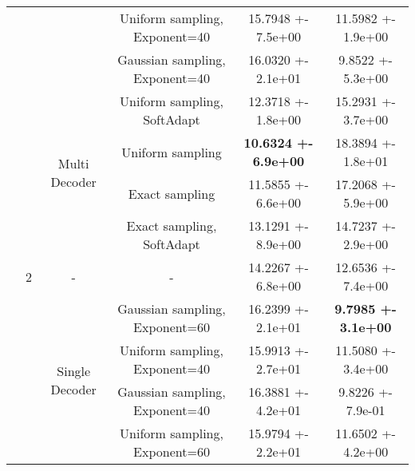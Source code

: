 \begin{center}
\begin{table}
\begin{tabular}{||c|c|c|c|c|c||}
\cline{4-6}
 &  &  & Uniform sampling, Exponent=40 & 15.7948 +- 7.5e+00 & 11.5982 +- 1.9e+00 \\
\cline{4-6}
 &  &  & Gaussian sampling, Exponent=40 & 16.0320 +- 2.1e+01 & 9.8522 +- 5.3e+00 \\
\cline{4-6}
\cline{3-6}
\cline{2-6}
 & \multirow{9}{*}{2} & \multirow{4}{*}{Multi Decoder} & Uniform sampling, SoftAdapt & 12.3718 +- 1.8e+00 & 15.2931 +- 3.7e+00 \\
\cline{4-6}
 &  &  & Uniform sampling & \textbf{10.6324 +- 6.9e+00} & 18.3894 +- 1.8e+01 \\
\cline{4-6}
 &  &  & Exact sampling & 11.5855 +- 6.6e+00 & 17.2068 +- 5.9e+00 \\
\cline{4-6}
 &  &  & Exact sampling, SoftAdapt & 13.1291 +- 8.9e+00 & 14.7237 +- 2.9e+00 \\
\cline{4-6}
\cline{3-6}
 &  & \multirow{1}{*}{-} & - & 14.2267 +- 6.8e+00 & 12.6536 +- 7.4e+00 \\
\cline{4-6}
\cline{3-6}
 &  & \multirow{4}{*}{Single Decoder} & Gaussian sampling, Exponent=60 & 16.2399 +- 2.1e+01 & \textbf{9.7985 +- 3.1e+00} \\
\cline{4-6}
 &  &  & Uniform sampling, Exponent=40 & 15.9913 +- 2.7e+01 & 11.5080 +- 3.4e+00 \\
\cline{4-6}
 &  &  & Gaussian sampling, Exponent=40 & 16.3881 +- 4.2e+01 & 9.8226 +- 7.9e-01 \\
\cline{4-6}
 &  &  & Uniform sampling, Exponent=60 & 15.9794 +- 2.2e+01 & 11.6502 +- 4.2e+00 \\
\cline{4-6}
\cline{3-6}
\cline{2-6}
\hline
\hline
\end{tabular}
\end{table}
\end{center}
